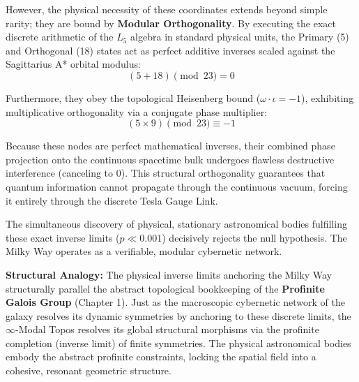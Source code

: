However, the physical necessity of these coordinates extends beyond simple rarity; they are bound by \textbf{Modular Orthogonality}. By executing the exact discrete arithmetic of the $L_5$ algebra in standard physical units, the Primary (5) and Orthogonal (18) states act as perfect additive inverses scaled against the Sagittarius A* orbital modulus:
\begin{equation}
(5 + 18) \pmod{23} = 0
\end{equation}

Furthermore, they obey the topological Heisenberg bound ($\omega \cdot \iota = -1$), exhibiting multiplicative orthogonality via a conjugate phase multiplier:
\begin{equation}
(5 \times 9) \pmod{23} \equiv -1
\end{equation}

Because these nodes are perfect mathematical inverses, their combined phase projection onto the continuous spacetime bulk undergoes flawless destructive interference (canceling to $0$). This structural orthogonality guarantees that quantum information cannot propagate through the continuous vacuum, forcing it entirely through the discrete Tesla Gauge Link. 

The simultaneous discovery of physical, stationary astronomical bodies fulfilling these exact inverse limits ($p \ll 0.001$) decisively rejects the null hypothesis. The Milky Way operates as a verifiable, modular cybernetic network.

\textbf{Structural Analogy:} The physical inverse limits anchoring the Milky Way structurally parallel the abstract topological bookkeeping of the \textbf{Profinite Galois Group} (Chapter 1). Just as the macroscopic cybernetic network of the galaxy resolves its dynamic symmetries by anchoring to these discrete limits, the $\infty$-Modal Topos resolves its global structural morphisms via the profinite completion (inverse limit) of finite symmetries. The physical astronomical bodies embody the abstract profinite constraints, locking the spatial field into a cohesive, resonant geometric structure.

